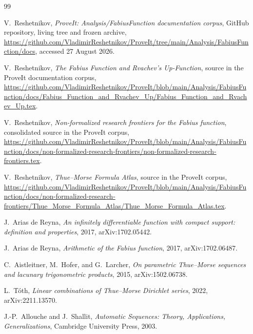 \documentclass[11pt,oneside]{article}
\numberwithin{equation}{section}
\theoremstyle{plain}
\theoremstyle{definition}
\theoremstyle{remark}
\begin{document}
\begin{thebibliography}{99}

V.~Reshetnikov,
\emph{ProveIt: Analysis/FabiusFunction documentation corpus},
GitHub repository, living tree and frozen archive,
\url{https://github.com/VladimirReshetnikov/ProveIt/tree/main/Analysis/FabiusFunction/docs},
accessed 27 August 2026.

V.~Reshetnikov,
\emph{The Fabius Function and Rvachev's Up-Function},
source in the ProveIt documentation corpus,
\url{https://github.com/VladimirReshetnikov/ProveIt/blob/main/Analysis/FabiusFunction/docs/Fabius_Function_and_Rvachev_Up/Fabius_Function_and_Rvachev_Up.tex}.

V.~Reshetnikov,
\emph{Non-formalized research frontiers for the Fabius function},
consolidated source in the ProveIt corpus,
\url{https://github.com/VladimirReshetnikov/ProveIt/blob/main/Analysis/FabiusFunction/docs/non-formalized-research-frontiers/non-formalized-research-frontiers.tex}.

V.~Reshetnikov,
\emph{Thue--Morse Formula Atlas},
source in the ProveIt corpus,
\url{https://github.com/VladimirReshetnikov/ProveIt/blob/main/Analysis/FabiusFunction/docs/non-formalized-research-frontiers/Thue_Morse_Formula_Atlas/Thue_Morse_Formula_Atlas.tex}.

J.~Arias de Reyna,
\emph{An infinitely differentiable function with compact support: definition and properties},
2017, arXiv:1702.05442.

J.~Arias de Reyna,
\emph{Arithmetic of the Fabius function},
2017, arXiv:1702.06487.

C.~Aistleitner, M.~Hofer, and G.~Larcher,
\emph{On parametric Thue--Morse sequences and lacunary trigonometric products},
2015, arXiv:1502.06738.

L.~T\'oth,
\emph{Linear combinations of Thue--Morse Dirichlet series},
2022, arXiv:2211.13570.

J.-P.~Allouche and J.~Shallit,
\emph{Automatic Sequences: Theory, Applications, Generalizations},
Cambridge University Press, 2003.

\end{thebibliography}
\end{document}
